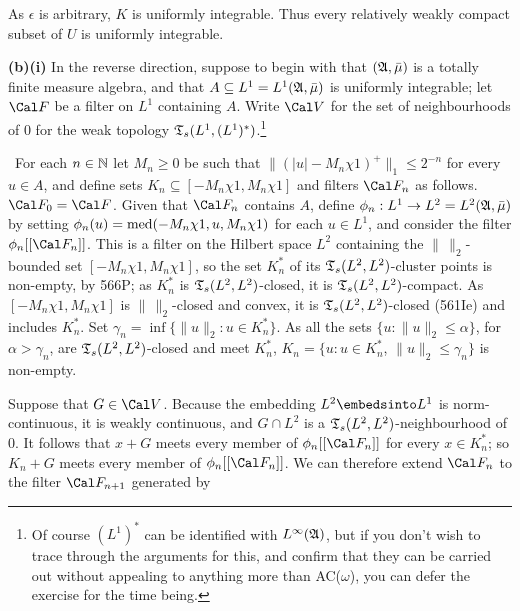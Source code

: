 {As $\epsilon$ is arbitrary, $K$ is uniformly integrable.   Thus every
relatively weakly compact subset of $U$ is uniformly integrable.

\medskip

{\bf (b)(i)} In the reverse direction, suppose to begin with
that $(\frak A,\bar\mu)$ is a totally finite measure algebra, and
that $A\subseteq L^1=L^1(\frak A,\bar\mu)$ is uniformly integrable;  let
$\Cal F$ be a filter on $L^1$ containing $A$.    Write $\Cal V$ for the set
of neighbourhoods of $0$ for the weak topology
$\frak T_s(L^1,(L^1)^*)$.\footnote{\smallerfonts
Of course $(L^1)^*$ can be identified
with $L^{\infty}(\frak A)$, but if
you don't wish to trace through the arguments for this, and confirm that
they can be carried out without appealing to anything more than
AC($\omega$), you can defer the exercise for the time being.}

\medskip

\qquad\grheada\ For each $n\in\Bbb N$ let $M_n\ge 0$ be such that
$\|(|u|-M_n\chi 1)^+\|_1\le 2^{-n}$ for every $u\in A$, and
define sets $K_n\subseteq[-M_n\chi 1,M_n\chi 1]$ and filters $\Cal F_n$
as follows.   $\Cal F_0=\Cal F$.   Given that $\Cal F_n$ contains $A$,
define $\phi_n:L^1\to L^2=L^2(\frak A,\bar\mu)$ by setting
$\phi_n(u)=\mathop{\text{med}}(-M_n\chi 1,u,M_n\chi 1)$ for each $u\in L^1$, and consider
the filter $\phi_n[[\Cal F_n]]$.   This is a filter on the Hilbert space
$L^2$ containing the $\|\,\|_2$-bounded set $[-M_n\chi 1,M_n\chi 1]$, so
the set $K_n^*$ of its $\frak T_s(L^2,L^2)$-cluster points is non-empty, by
566P;  as $K_n^*$ is $\frak T_s(L^2,L^2)$-closed, it is
$\frak T_s(L^2,L^2)$-compact.
As $[-M_n\chi 1,M_n\chi 1]$ is $\|\,\|_2$-closed and convex, it is
$\frak T_s(L^2,L^2)$-closed (561Ie) and includes $K_n^*$.
Set $\gamma_n=\inf\{\|u\|_2:u\in K_n^*\}$.   As all the sets
$\{u:\|u\|_2\le\alpha\}$, for $\alpha>\gamma_n$, are
$\frak T_s(L^2,L^2)$-closed and meet $K_n^*$,
$K_n=\{u:u\in K_n^*$, $\|u\|_2\le\gamma_n\}$ is non-empty.

Suppose that $G\in\Cal V$.
Because the embedding $L^2\embedsinto L^1$ is norm-continuous, it is weakly
continuous, and $G\cap L^2$ is a $\frak T_s(L^2,L^2)$-neighbourhood of $0$.
It follows that
$x+G$ meets every member of $\phi_n[[\Cal F_n]]$ for every $x\in K^*_n$;
so $K_n+G$ meets every member of $\phi_n[[\Cal F_n]]$.   We can therefore
extend $\Cal F_n$ to the filter $\Cal F_{n+1}$ generated by


}

